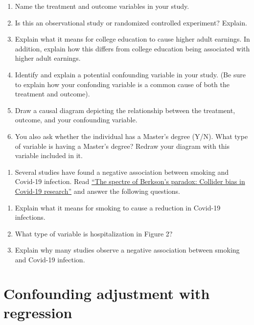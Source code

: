 \documentclass[]{book}
\providecommand{\tightlist}{%
  \setlength{\itemsep}{0pt}\setlength{\parskip}{0pt}}
\begin{document}
\begin{enumerate}
\def\labelenumi{\alph{enumi})}
\item
  Name the treatment and outcome variables in your study.
\item
  Is this an observational study or randomized controlled experiment? Explain.
\item
  Explain what it means for college education to cause higher adult earnings. In addition, explain how this differs from college education being associated with higher adult earnings.
\item
  Identify and explain a potential confounding variable in your study. (Be sure to explain how your confonding variable is a common cause of both the treatment and outcome).
\item
  Draw a causal diagram depicting the relationship between the treatment, outcome, and your confounding variable.
\item
  You also ask whether the individual has a Master's degree (Y/N). What type of variable is having a Master's degree? Redraw your diagram with this variable included in it.
\end{enumerate}

\begin{enumerate}
\def\labelenumi{\arabic{enumi}.}
\setcounter{enumi}{1}
\tightlist
\item
  Several studies have found a negative association between smoking and Covid-19 infection. Read \href{https://rss.onlinelibrary.wiley.com/doi/10.1111/1740-9713.01413}{``The spectre of Berkson's paradox: Collider bias in Covid-19 research''} and answer the following questions.
\end{enumerate}

\begin{enumerate}
\def\labelenumi{\alph{enumi})}
\item
  Explain what it means for smoking to cause a reduction in Covid-19 infections.
\item
  What type of variable is hospitalization in Figure 2?
\item
  Explain why many studies observe a negative association between smoking and Covid-19 infection.
\end{enumerate}

\hypertarget{confounding-adjustment-with-regression}{%
\chapter{Confounding adjustment with regression}\label{confounding-adjustment-with-regression}}
\end{document}
